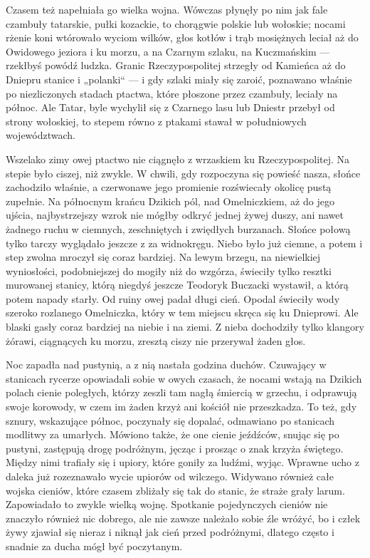 Czasem też napełniała go wielka wojna. Wówczas płynęły po nim jak fale czambuły tatarskie, pułki kozackie, to chorągwie polskie lub wołoskie; nocami rżenie koni wtórowało wyciom wilków, głos kotłów i trąb mosiężnych leciał aż do Owidowego jeziora i ku morzu, a na Czarnym szlaku, na Kuczmańskim — rzekłbyś powódź ludzka. Granic Rzeczypospolitej strzegły od Kamieńca aż do Dniepru stanice i „polanki“ — i gdy szlaki miały się zaroić, poznawano właśnie po niezliczonych stadach ptactwa, które płoszone przez czambuły, leciały na północ. Ale Tatar, byle wychylił się z Czarnego lasu lub Dniestr przebył od strony wołoskiej, to stepem równo z ptakami stawał w południowych województwach.

Wszelako zimy owej ptactwo nie ciągnęło z wrzaskiem ku Rzeczypospolitej. Na stepie było ciszej, niż zwykle. W chwili, gdy rozpoczyna się powieść nasza, słońce zachodziło właśnie, a czerwonawe jego promienie rozświecały okolicę pustą zupełnie. Na północnym krańcu Dzikich pól, nad Omelniczkiem, aż do jego ujścia, najbystrzejszy wzrok nie mógłby odkryć jednej żywej duszy, ani nawet żadnego ruchu w ciemnych, zeschniętych i zwiędłych burzanach. Słońce połową tylko tarczy wyglądało jeszcze z za widnokręgu. Niebo było już ciemne, a potem i step zwolna mroczył się coraz bardziej. Na lewym brzegu, na niewielkiej wyniosłości, podobniejszej do mogiły niż do wzgórza, świeciły tylko resztki murowanej stanicy, którą niegdyś jeszcze Teodoryk Buczacki wystawił, a którą potem napady starły. Od ruiny owej padał długi cień. Opodal świeciły wody szeroko rozlanego Omelniczka, który w tem miejscu skręca się ku Dnieprowi. Ale blaski gasły coraz bardziej na niebie i na ziemi. Z nieba dochodziły tylko klangory żórawi, ciągnących ku morzu, zresztą ciszy nie przerywał żaden głos.

Noc zapadła nad pustynią, a z nią nastała godzina duchów. Czuwający w stanicach rycerze opowiadali sobie w owych czasach, że nocami wstają na Dzikich polach cienie poległych, którzy zeszli tam nagłą śmiercią w grzechu, i odprawują swoje korowody, w czem im żaden krzyż ani kościół nie przeszkadza. To też, gdy sznury, wskazujące północ, poczynały się dopalać, odmawiano po stanicach modlitwy za umarłych. Mówiono także, że one cienie jeźdźców, snując się po pustyni, zastępują drogę podróżnym, jęcząc i prosząc o znak krzyża świętego. Między nimi trafiały się i upiory, które goniły za ludźmi, wyjąc. Wprawne ucho z daleka już rozeznawało wycie upiorów od wilczego. Widywano również całe wojska cieniów, które czasem zbliżały się tak do stanic, że straże grały larum. Zapowiadało to zwykle wielką wojnę. Spotkanie pojedynczych cieniów nie znaczyło również nic dobrego, ale nie zawsze należało sobie źle wróżyć, bo i człek żywy zjawiał się nieraz i niknął jak cień przed podróżnymi, dlatego często i snadnie za ducha mógł być poczytanym.

